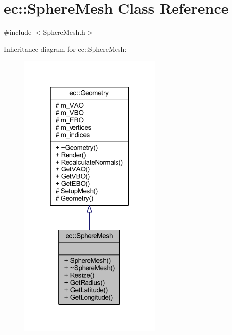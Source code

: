 \hypertarget{classec_1_1_sphere_mesh}{}\section{ec\+:\+:Sphere\+Mesh Class Reference}
\label{classec_1_1_sphere_mesh}


{\ttfamily \#include $<$Sphere\+Mesh.\+h$>$}



Inheritance diagram for ec\+:\+:Sphere\+Mesh\+:
\nopagebreak
\begin{figure}[H]
\begin{center}
\leavevmode
\includegraphics[width=199pt]{classec_1_1_sphere_mesh__inherit__graph}
\end{center}
\end{figure}


